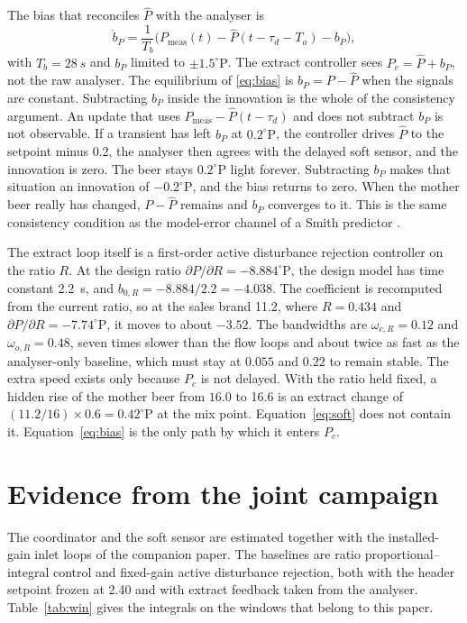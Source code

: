 \documentclass[conference,a4paper]{IEEEtran}
\newcommand{\degP}{^{\circ}\mathrm{P}}
\begin{document}
The bias that reconciles $\hat{P}$ with the analyser is
\begin{equation}
\label{eq:bias}
\dot{b}_P=\frac{1}{T_b}\Big(P_{\mathrm{meas}}(t)-\hat{P}(t-\tau_d-T_a)-b_P\Big),
\end{equation}
with $T_b=\SI{28}{s}$ and $b_P$ limited to $\pm 1.5\degP$. The extract controller sees $P_c=\hat{P}+b_P$, not the raw analyser. The equilibrium of \eqref{eq:bias} is $b_P=P-\hat{P}$ when the signals are constant. Subtracting $b_P$ inside the innovation is the whole of the consistency argument. An update that uses $P_{\mathrm{meas}}-\hat{P}(t-\tau_d)$ and does not subtract $b_P$ is not observable. If a transient has left $b_P$ at $0.2\degP$, the controller drives $\hat{P}$ to the setpoint minus $0.2$, the analyser then agrees with the delayed soft sensor, and the innovation is zero. The beer stays $0.2\degP$ light forever. Subtracting $b_P$ makes that situation an innovation of $-0.2\degP$, and the bias returns to zero. When the mother beer really has changed, $P-\hat{P}$ remains and $b_P$ converges to it. This is the same consistency condition as the model-error channel of a Smith predictor \cite{smith1957closer,zheng2014predictive,zhao2014delay}.

The extract loop itself is a first-order active disturbance rejection controller on the ratio $R$. At the design ratio $\partial P/\partial R=-8.884\degP$, the design model has time constant \SI{2.2}{s}, and $b_{0,R}=-8.884/2.2=-4.038$. The coefficient is recomputed from the current ratio, so at the sales brand \SI{11.2}{\plato}, where $R=0.434$ and $\partial P/\partial R=-7.74\degP$, it moves to about $-3.52$. The bandwidths are $\omega_{c,R}=0.12$ and $\omega_{o,R}=0.48$, seven times slower than the flow loops and about twice as fast as the analyser-only baseline, which must stay at $0.055$ and $0.22$ to remain stable. The extra speed exists only because $P_c$ is not delayed. With the ratio held fixed, a hidden rise of the mother beer from $16.0$ to \SI{16.6}{\plato} is an extract change of $(11.2/16)\times 0.6=0.42\degP$ at the mix point. Equation~\eqref{eq:soft} does not contain it. Equation~\eqref{eq:bias} is the only path by which it enters $P_c$.

\section{Evidence from the joint campaign}
The coordinator and the soft sensor are estimated together with the installed-gain inlet loops of the companion paper. The baselines are ratio proportional--integral control and fixed-gain active disturbance rejection, both with the header setpoint frozen at \SI{2.40}{\barg} and with extract feedback taken from the analyser. Table~\ref{tab:win} gives the integrals on the windows that belong to this paper.
\end{document}
